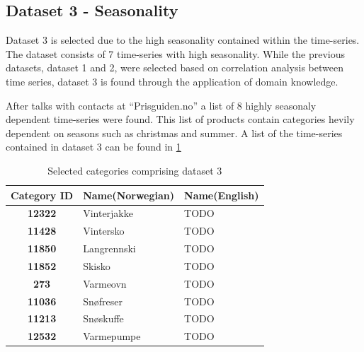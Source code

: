 \subsection{Dataset 3 - Seasonality}

Dataset 3 is selected due to the high seasonality contained within the time-series.
The dataset consists of 7 time-series with high seasonality.
While the previous datasets, dataset 1 and 2, were selected based on correlation analysis between time series,
dataset 3 is found through the application of domain knowledge.

After talks with contacts at ``Prisguiden.no'' a list of 8 highly seasonaly dependent time-series were found.
This list of products contain categories hevily dependent on seasons such as christmas and summer.
A list of the time-series contained in dataset 3 can be found in \cref{table:dataset3}


\begin{table}[h]
  \centering
  \caption{Selected categories comprising dataset 3}
  \label{table:dataset3}
  \begin{tabular}{|c|l|l|}\hline
    Category ID & Name(Norwegian)    & Name(English) \\ \hline
    \textbf{12322  } & Vinterjakke   & TODO          \\ \hline
    \textbf{11428  } & Vintersko     & TODO          \\ \hline
    \textbf{11850  } & Langrennski   & TODO          \\ \hline
    \textbf{11852  } & Skisko        & TODO          \\ \hline
    \textbf{273    } & Varmeovn      & TODO          \\ \hline
    \textbf{11036  } & Snøfreser     & TODO          \\ \hline
    \textbf{11213  } & Snøskuffe     & TODO          \\ \hline
    \textbf{12532  } & Varmepumpe    & TODO          \\ \hline
  \end{tabular}
\end{table}



